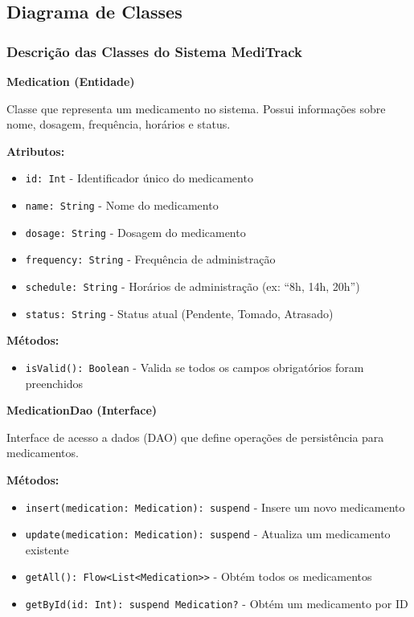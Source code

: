 \documentclass[12pt]{article}
\begin{document}
\subsection{Diagrama de Classes}

\subsubsection{Descrição das Classes do Sistema MediTrack}

\textbf{Medication (Entidade)}

Classe que representa um medicamento no sistema. Possui informações sobre nome, dosagem, frequência, horários e status.

\textbf{Atributos:}
\begin{itemize}
    \item \texttt{id: Int} - Identificador único do medicamento
    \item \texttt{name: String} - Nome do medicamento
    \item \texttt{dosage: String} - Dosagem do medicamento
    \item \texttt{frequency: String} - Frequência de administração
    \item \texttt{schedule: String} - Horários de administração (ex: ``8h, 14h, 20h'')
    \item \texttt{status: String} - Status atual (Pendente, Tomado, Atrasado)
\end{itemize}

\textbf{Métodos:}
\begin{itemize}
    \item \texttt{isValid(): Boolean} - Valida se todos os campos obrigatórios foram preenchidos
\end{itemize}

\textbf{MedicationDao (Interface)}

Interface de acesso a dados (DAO) que define operações de persistência para medicamentos.

\textbf{Métodos:}
\begin{itemize}
    \item \texttt{insert(medication: Medication): suspend} - Insere um novo medicamento
    \item \texttt{update(medication: Medication): suspend} - Atualiza um medicamento existente
    \item \texttt{getAll(): Flow<List<Medication>>} - Obtém todos os medicamentos
    \item \texttt{getById(id: Int): suspend Medication?} - Obtém um medicamento por ID
\end{itemize}
\end{document}
